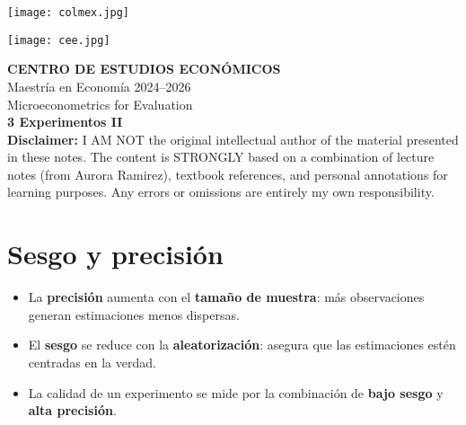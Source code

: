 \documentclass[12pt]{article}
\title{}
\author{}
\date{}
\begin{document}
\begin{titlepage}
    \vspace*{-1cm}
    \noindent
    \begin{minipage}[t]{0.49\textwidth}
        \texttt{[image: colmex.jpg]}
    \end{minipage}%
    \begin{minipage}[t]{0.49\textwidth}
        \raggedleft
        \texttt{[image: cee.jpg]}
    \end{minipage}

    \vspace*{2cm}

    \begin{center}
        \Huge \textbf{CENTRO DE ESTUDIOS ECONÓMICOS} \\[1.5em]
        \Large Maestría en Economía 2024--2026 \\[2em]
        \Large Microeconometrics for Evaluation \\[3em]
        \LARGE \textbf{3 Experimentos II} \\[3em]
        \large \textbf{Disclaimer:} I AM NOT the original intellectual author of the material presented in these notes. The content is STRONGLY based on a combination of lecture notes (from Aurora Ramirez), textbook references, and personal annotations for learning purposes. Any errors or omissions are entirely my own responsibility.\\[0.9em]
        
    \end{center}

    \vfill
\end{titlepage}

\newpage

\setcounter{secnumdepth}{2}
\setcounter{tocdepth}{4}
\tableofcontents

\newpage

\section*{\noindent\textbf{Sesgo y precisión}}

\begin{itemize}
    \item La \textbf{precisión} aumenta con el \textbf{tamaño de muestra}: más observaciones generan estimaciones menos dispersas.
    \item El \textbf{sesgo} se reduce con la \textbf{aleatorización}: asegura que las estimaciones estén centradas en la verdad.
    \item La calidad de un experimento se mide por la combinación de \textbf{bajo sesgo} y \textbf{alta precisión}.
\end{itemize}
\end{document}
